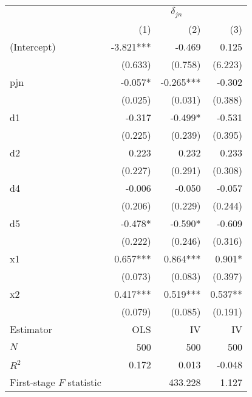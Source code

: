 \begin{tabular}{lrrr}
\toprule
                          & \multicolumn{3}{c}{$\delta_{jn}$} \\ 
\cmidrule(lr){2-4} 
                          &       (1) &       (2) &       (3) \\ 
\midrule
(Intercept)               & -3.821*** &    -0.469 &     0.125 \\ 
                          &   (0.633) &   (0.758) &   (6.223) \\ 
pjn                       &   -0.057* & -0.265*** &    -0.302 \\ 
                          &   (0.025) &   (0.031) &   (0.388) \\ 
d1                        &    -0.317 &   -0.499* &    -0.531 \\ 
                          &   (0.225) &   (0.239) &   (0.395) \\ 
d2                        &     0.223 &     0.232 &     0.233 \\ 
                          &   (0.227) &   (0.291) &   (0.308) \\ 
d4                        &    -0.006 &    -0.050 &    -0.057 \\ 
                          &   (0.206) &   (0.229) &   (0.244) \\ 
d5                        &   -0.478* &   -0.590* &    -0.609 \\ 
                          &   (0.222) &   (0.246) &   (0.316) \\ 
x1                        &  0.657*** &  0.864*** &    0.901* \\ 
                          &   (0.073) &   (0.083) &   (0.397) \\ 
x2                        &  0.417*** &  0.519*** &   0.537** \\ 
                          &   (0.079) &   (0.085) &   (0.191) \\ 
\midrule
Estimator                 &       OLS &        IV &        IV \\ 
\midrule
$N$                       &       500 &       500 &       500 \\ 
$R^2$                     &     0.172 &     0.013 &    -0.048 \\ 
First-stage $F$ statistic &           &   433.228 &     1.127 \\ 
\bottomrule
\end{tabular}
